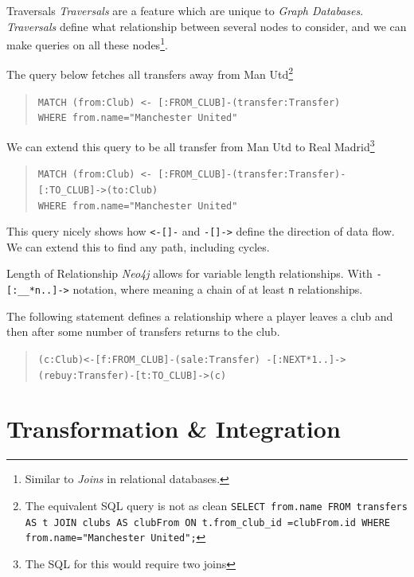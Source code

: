 \documentclass[11pt,a4paper]{article}
\begin{document}
  \begin{proposition}{Traversals}
    \textit{Traversals} are a feature which are unique to \textit{Graph Databases}. \textit{Traversals} define what relationship between several nodes to consider, and we can make queries on all these nodes\footnote{Similar to \textit{Joins} in relational databases.}.
    \par The query below fetches all transfers away from Man Utd\footnote{The equivalent SQL query is not as clean \texttt{SELECT from.name FROM transfers AS t JOIN clubs AS clubFrom ON t.from\_club\_id =clubFrom.id WHERE from.name="Manchester United";} }
    \begin{quote}
      \texttt{MATCH (from:Club) <- [:FROM\_CLUB]-(transfer:Transfer)}\\
      \texttt{WHERE from.name="Manchester United"}
    \end{quote}
    \par We can extend this query to be all transfer from Man Utd to Real Madrid\footnote{The SQL for this would require two joins}
    \begin{quote}
      \texttt{MATCH (from:Club) <- [:FROM\_CLUB]-(transfer:Transfer)-[:TO\_CLUB]->(to:Club)}\\
      \texttt{WHERE from.name="Manchester United"}
    \end{quote}
    This query nicely shows how \texttt{<-[]-} and \texttt{-[]->} define the direction of data flow. We can extend this to find any path, including cycles.
  \end{proposition}

  \begin{proposition}{Length of Relationship}
    \textit{Neo4j} allows for variable length relationships. With \texttt{-[:\_\_*n..]->} notation, where meaning a chain of at least \texttt{n} relationships.
    \par The following statement defines a relationship where a player leaves a club and then after some number of transfers returns to the club.
    \begin{quote}
      \texttt{(c:Club)<-[f:FROM\_CLUB]-(sale:Transfer) -[:NEXT*1..]->(rebuy:Transfer)-[t:TO\_CLUB]->(c)}
    \end{quote}
  \end{proposition}

\section{Transformation \& Integration}\label{sec_transformation_and_integration}
\end{document}
